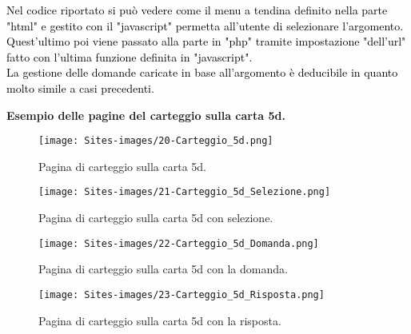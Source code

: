 \begin{minipage}{\textwidth}
	\vspace*{-19cm}
	\raggedright
	\textcolor{black}{Nel codice riportato si può vedere come il menu a tendina definito nella parte "html" e gestito con il "javascript" permetta all'utente di selezionare l'argomento. Quest'ultimo poi viene passato alla parte in "php" tramite impostazione "dell'url" fatto con l'ultima funzione definita in "javascript".\\
	La gestione delle domande caricate in base all'argomento è deducibile in quanto molto simile a casi precedenti.}\\
\end{minipage}

\begin{minipage}{\textwidth}
	\begin{center}
		\textbf{Esempio delle pagine del carteggio sulla carta 5d.}
	\end{center}
	
	\begin{figure}[H]
		\begin{center}
			\texttt{[image: Sites-images/20-Carteggio\_5d.png]}
			\caption{Pagina di carteggio sulla carta 5d.}
		\end{center}
	\end{figure}
	
	\begin{figure}[H]
		\begin{center}
			\texttt{[image: Sites-images/21-Carteggio\_5d\_Selezione.png]}
			\caption{Pagina di carteggio sulla carta 5d con selezione.}
		\end{center}
	\end{figure}
\end{minipage}

\begin{minipage}{\textwidth}
\begin{figure}[H]
	\begin{center}
		\texttt{[image: Sites-images/22-Carteggio\_5d\_Domanda.png]}
		\caption{Pagina di carteggio sulla carta 5d con la domanda.}
	\end{center}
\end{figure}

\begin{figure}[H]
	\begin{center}
		\texttt{[image: Sites-images/23-Carteggio\_5d\_Risposta.png]}
		\caption{Pagina di carteggio sulla carta 5d con la risposta.}
	\end{center}
\end{figure}
\end{minipage}


